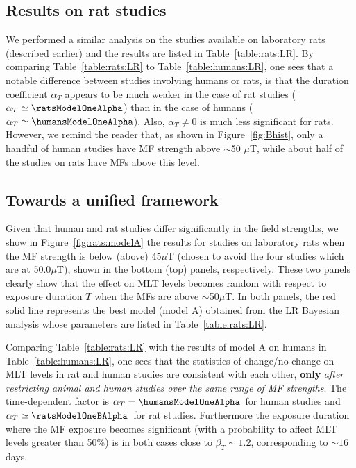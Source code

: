 \documentclass[letter,twoside]{article}
\begin{document}
\subsection*{Results on rat studies}
\label{section:results:rats}

We performed a similar analysis on the  studies available on laboratory rats (described earlier) and the results are listed  in  Table~\ref{table:rats:LR}. By comparing Table~\ref{table:rats:LR} to Table~\ref{table:humans:LR}, one sees that a notable difference  between studies involving humans or rats, is that the duration coefficient $\alpha_T$
 appears to be much weaker in the case of rat studies ($\alpha_T\simeq \ratsModelOneAlpha$) than in the case of humans ($\alpha_T\simeq \humansModelOneAlpha$). Also,  $\alpha_T\neq0$ is much less significant  for rats.
However, we remind the reader that, as shown in Figure~\ref{fig:Bhist}, only a handful of human studies  have MF strength above $
\sim$50 $\mu$T, while about half of the studies on rats have MFs above this level.


\subsection*{Towards a unified framework} 
\label{section:results:bimodal}

Given that human and rat studies differ significantly in the field strengths,  we show  in Figure~\ref{fig:rats:modelA}  the results for studies on laboratory rats when the MF strength is below (above)  45$\mu$T (chosen to avoid the four studies which are at 50.0$\mu$T), shown   in the bottom (top) panels, respectively. 
These two panels clearly show that the effect on MLT levels becomes  random with respect to exposure duration $T$ when the MFs are above $\sim$50$\mu$T.
In both panels, the red solid line represents the best  model (model A) obtained from the LR Bayesian analysis whose parameters are listed in Table~\ref{table:rats:LR}.


Comparing Table~\ref{table:rats:LR} with the results of model A on humans in Table~\ref{table:humans:LR},
one sees that  the statistics of change/no-change on MLT levels in
 rat and human studies are consistent with each other,  {\bf only} {\it after restricting animal and human studies over the same range of MF strengths}.
The time-dependent factor  is $\alpha_T=\humansModelOneAlpha$\humansModelOneAlphaErr\ for human studies and $\alpha_T\simeq\ratsModelOneBAlpha$\ratsModelOneBAlphaErr\ for rat studies. 
 Furthermore the exposure duration where the MF exposure  becomes significant (with a probability to affect MLT levels greater than 50\%) is in both cases close to $\beta_T\sim1.2$, corresponding to  $\sim16$ days.
\end{document}
